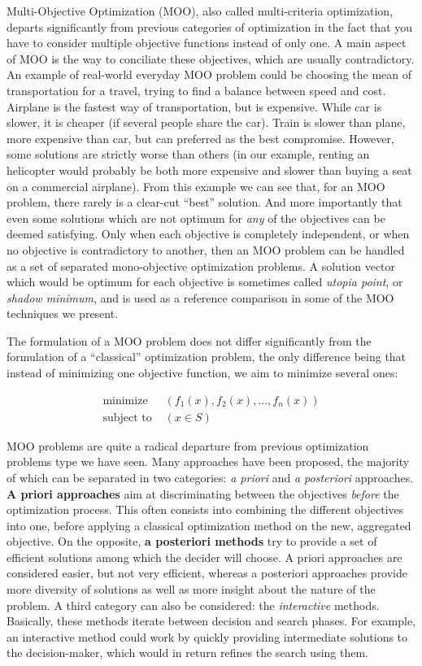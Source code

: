 Multi-Objective Optimization (MOO), also called multi-criteria optimization, departs significantly from previous categories of optimization in the fact that you have to consider multiple objective functions instead of only one. A main aspect of MOO is the way to conciliate these objectives, which are usually contradictory.
An example of real-world everyday MOO problem could be choosing the mean of transportation for a travel, trying to find a balance between speed and cost. Airplane is the fastest way of transportation, but is expensive. While car is slower, it is cheaper (if several people share the car). Train is slower than plane, more expensive than car, but can preferred as the best compromise. However, some solutions are strictly worse than others (in our example, renting an helicopter would probably be both more expensive and slower than buying a seat on a commercial airplane).
From this example we can see that, for an MOO problem, there rarely is a clear-cut \enquote{best} solution. And more importantly that even some solutions which are not optimum for \emph{any} of the objectives can be deemed satisfying. Only when each objective is completely independent, or when no objective is contradictory to another, then an MOO problem can be handled as a set of separated mono-objective optimization problems.
A solution vector which would be optimum for each objective is sometimes called \emph{utopia point}, or \emph{shadow minimum}, and is used as a reference comparison in some of the MOO techniques we present.

The formulation of a MOO problem does not differ significantly from the formulation of a \enquote{classical} optimization problem, the only difference being that instead of minimizing one objective function, we aim to minimize several ones:

\begin{align*}
\text{minimize } & (f_1(x), f_2(x), ..., f_n(x))\\
\text{subject to } & (x \in S)
\end{align*}

MOO problems are quite a radical departure from previous optimization problems type we have seen. Many approaches have been proposed, the majority of which can be separated in two categories: \emph{a priori} and \emph{a posteriori} approaches. \textbf{A priori approaches} aim at discriminating between the objectives \emph{before} the optimization process. This often consists into combining the different objectives into one, before applying a classical optimization method on the new, aggregated objective.
On the opposite, \textbf{a posteriori methods} try to provide a set of efficient solutions among which the decider will choose.
A priori approaches are considered easier, but not very efficient, whereas a posteriori approaches provide more diversity of solutions as well as more insight about the nature of the problem.
A third category can also be considered: the \emph{interactive} methods. Basically, these methods iterate between decision and search phases. For example, an interactive method could work by quickly providing intermediate solutions to the decision-maker, which would in return refines the search using them.

